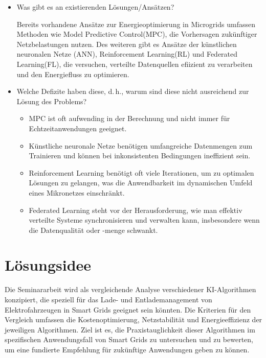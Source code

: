 \documentclass[12pt]{article} %
\begin{document}
\begin{itemize}
\item Was gibt es an existierenden Lösungen/Ansätzen?

Bereits vorhandene Ansätze zur Energieoptimierung in Microgrids umfassen Methoden wie
Model Predictive Control(MPC), die Vorhersagen zukünftiger Netzbelastungen nutzen.
Des weiteren gibt es Ansätze der künstlichen neuronalen Netze (ANN), Reinforcement Learning(RL) und Federated Learning(FL), die versuchen, verteilte Datenquellen efiizient zu verarbeiten und den Energiefluss zu optimieren.
\item Welche Defizite haben diese, d.\,h., warum sind diese nicht ausreichend
      zur Lösung des Problems?

     \begin{itemize}
      \item MPC ist oft aufwending in der Berechnung und nicht immer für Echtzeitanwendungen geeignet.
      \item Künstliche neuronale Netze benötigen umfangreiche Datenmengen zum Trainieren und können bei inkonsistenten Bedingungen ineffizient sein.
      \item Reinforcement Learning benötigt oft viele Iterationen, um zu optimalen Lösungen zu gelangen, was die Anwendbarkeit im dynamischen Umfeld eines Mikronetzes einschränkt.
      \item Federated Learning steht vor der Herausforderung, wie man effektiv verteilte Systeme synchronisieren und verwalten kann, insbesondere wenn die Datenqualität oder -menge schwankt.
      \end{itemize}




      
\end{itemize}


\section{Lösungsidee}

Die Seminararbeit wird als vergleichende Analyse verschiedener KI-Algorithmen konzipiert, die speziell für das Lade- und Entlademanagement von Elektrofahrzeugen in Smart Grids geeignet sein könnten. Die Kriterien für den Vergleich umfassen die Kostenoptimierung, Netzstabilität und Energieeffizienz der jeweiligen Algorithmen. Ziel ist es, die Praxistauglichkeit dieser Algorithmen im spezifischen Anwendungsfall von Smart Grids zu untersuchen und zu bewerten, um eine fundierte Empfehlung für zukünftige Anwendungen geben zu können.
\end{document}
